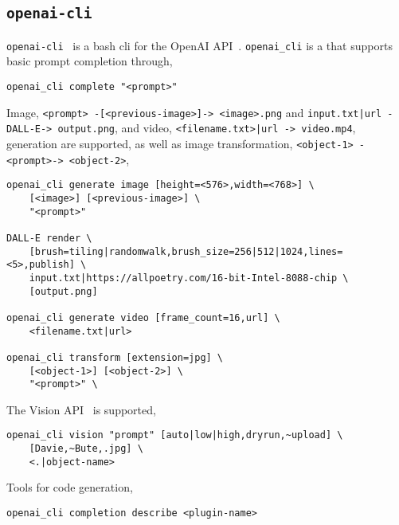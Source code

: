 \subsection{\texttt{openai-cli}}

\texttt{openai-cli}~ is a bash cli for the OpenAI API~. \texttt{openai_cli} is a  that supports basic prompt completion through,
%
\begin{verbatim}
openai_cli complete "<prompt>"
\end{verbatim}
%
Image, \texttt{<prompt> -[<previous-image>]-> <image>.png} and \texttt{input.txt|url -DALL-E-> output.png}, and video, \texttt{<filename.txt>|url -> video.mp4}, generation are supported, as well as image transformation, \texttt{<object-1> -<prompt>-> <object-2>},
%
\begin{verbatim}
openai_cli generate image [height=<576>,width=<768>] \
    [<image>] [<previous-image>] \
    "<prompt>"

DALL-E render \
    [brush=tiling|randomwalk,brush_size=256|512|1024,lines=<5>,publish] \
    input.txt|https://allpoetry.com/16-bit-Intel-8088-chip \
    [output.png]

openai_cli generate video [frame_count=16,url] \
    <filename.txt|url>

openai_cli transform [extension=jpg] \
    [<object-1>] [<object-2>] \
    "<prompt>" \
\end{verbatim}
%
The Vision API~ is supported,
%
\begin{verbatim}
openai_cli vision "prompt" [auto|low|high,dryrun,~upload] \
    [Davie,~Bute,.jpg] \
    <.|object-name>
\end{verbatim}
%
Tools for code generation,
%
\begin{verbatim}
openai_cli completion describe <plugin-name>
\end{verbatim}